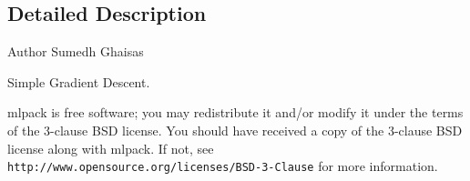 \subsection{Detailed Description}
\begin{DoxyAuthor}{Author}
Sumedh Ghaisas
\end{DoxyAuthor}
Simple Gradient Descent.

mlpack is free software; you may redistribute it and/or modify it under the terms of the 3-\/clause B\+SD license. You should have received a copy of the 3-\/clause B\+SD license along with mlpack. If not, see {\tt http\+://www.\+opensource.\+org/licenses/\+B\+S\+D-\/3-\/\+Clause} for more information. 